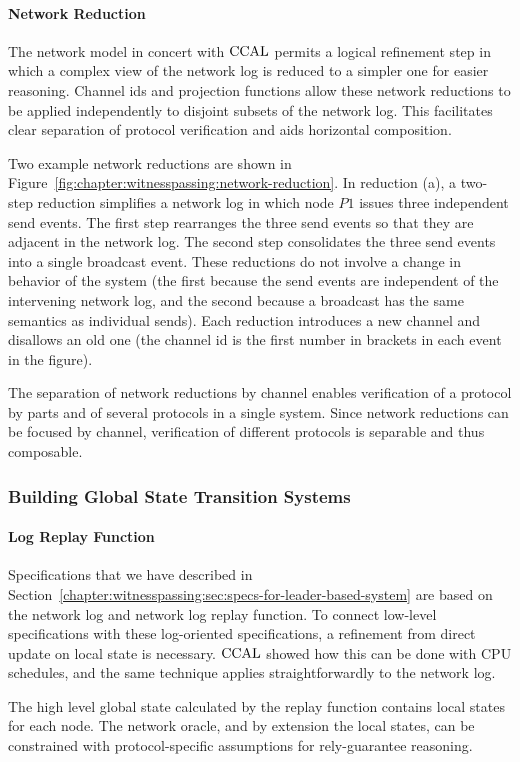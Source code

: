 \paragraph{Network Reduction}
The network model in concert with $\mathrm{CCAL}$ permits a logical refinement step in
which a complex view of the network log is reduced to a simpler one for easier
reasoning. Channel ids and projection functions allow these network
reductions to be applied independently to disjoint subsets of the network log.
This facilitates clear separation of protocol verification and aids
horizontal composition.

Two example network reductions are shown in Figure~\ref{fig:chapter:witnesspassing:network-reduction}. In
reduction (a), a two-step reduction simplifies a network log in which node $P1$
issues three independent send events. The first step rearranges the three send
events so that they are adjacent in the network log. The second step
consolidates the three send events into a single broadcast event. These
reductions do not involve a change in behavior of the system (the first because
the send events are independent of the intervening network log, and the second
because a broadcast has the same semantics as individual sends). Each reduction
introduces a new channel and disallows an old one (the channel id is the first
number in brackets in each event in the figure).

The separation of network reductions by channel enables verification of a
protocol by parts and of several protocols in a single system. Since network
reductions can be focused by channel, verification of different protocols is
separable and thus composable.


\subsubsection{Building Global State Transition Systems}

\paragraph{Log Replay Function}
Specifications that we have described in
 Section~\ref{chapter:witnesspassing:sec:specs-for-leader-based-system}
 are based on the network log and network
log replay function. To connect low-level specifications with these log-oriented
specifications, a refinement from direct update on local state is necessary. 
 $\mathrm{CCAL}$  showed how this can
be done with CPU schedules, and the same technique applies straightforwardly to
the network log.

The high level global state calculated by the replay function contains local
states for each node. The network oracle, and by extension the local states, can
be constrained with protocol-specific assumptions for rely-guarantee reasoning.
